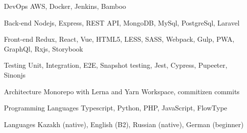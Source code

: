 

\begin{cvskills}

  \cvskill
    {DevOps} %
    {AWS, Docker, Jenkins, Bamboo} %

  \cvskill
    {Back-end} %
    {Nodejs, Express, REST API, MongoDB, MySql, PostgreSql, Laravel} %

  \cvskill
    {Front-end} %
    {Redux, React, Vue, HTML5, LESS, SASS, Webpack, Gulp, PWA, GraphQl, Rxjs, Storybook} %

  \cvskill
    {Testing} %
    {Unit, Integration, E2E, Snapshot testing, Jest, Cypress, Pupeeter, Sinonjs} 

  \cvskill
    {Architecture} %
      {Monorepo with Lerna and Yarn Workspace, commitizen commits} 

  \cvskill
    {Programming Languages} %
    {Typescript, Python, PHP, JavaScript, FlowType} %

  \cvskill
    {Languages} %
    {Kazakh (native), English (B2), Russian (native), German (beginner)} %

\end{cvskills}
